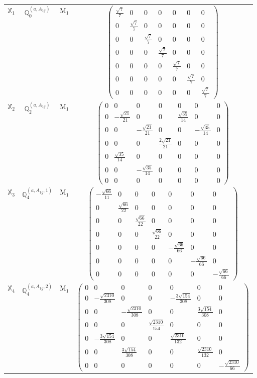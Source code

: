 \documentclass[fleqn,10pt,landscape]{article}
\begin{document}
\begin{itemize}
\begin{center}
\begin{longtable}{c|c|c|c}
$ \mathbb{X}_{1} $ & $\mathbb{Q}_{0}^{(a,A_{1g})}$ & M$_{1}$ & $\begin{pmatrix} \frac{\sqrt{7}}{7} & 0 & 0 & 0 & 0 & 0 & 0 \\ 0 & \frac{\sqrt{7}}{7} & 0 & 0 & 0 & 0 & 0 \\ 0 & 0 & \frac{\sqrt{7}}{7} & 0 & 0 & 0 & 0 \\ 0 & 0 & 0 & \frac{\sqrt{7}}{7} & 0 & 0 & 0 \\ 0 & 0 & 0 & 0 & \frac{\sqrt{7}}{7} & 0 & 0 \\ 0 & 0 & 0 & 0 & 0 & \frac{\sqrt{7}}{7} & 0 \\ 0 & 0 & 0 & 0 & 0 & 0 & \frac{\sqrt{7}}{7} \end{pmatrix}$ \\
$ \mathbb{X}_{2} $ & $\mathbb{Q}_{2}^{(a,A_{1g})}$ & M$_{1}$ & $\begin{pmatrix} 0 & 0 & 0 & 0 & 0 & 0 & 0 \\ 0 & - \frac{\sqrt{21}}{21} & 0 & 0 & \frac{\sqrt{35}}{14} & 0 & 0 \\ 0 & 0 & - \frac{\sqrt{21}}{21} & 0 & 0 & - \frac{\sqrt{35}}{14} & 0 \\ 0 & 0 & 0 & \frac{2 \sqrt{21}}{21} & 0 & 0 & 0 \\ 0 & \frac{\sqrt{35}}{14} & 0 & 0 & 0 & 0 & 0 \\ 0 & 0 & - \frac{\sqrt{35}}{14} & 0 & 0 & 0 & 0 \\ 0 & 0 & 0 & 0 & 0 & 0 & 0 \end{pmatrix}$ \\
$ \mathbb{X}_{3} $ & $\mathbb{Q}_{4}^{(a,A_{1g},1)}$ & M$_{1}$ & $\begin{pmatrix} - \frac{\sqrt{66}}{11} & 0 & 0 & 0 & 0 & 0 & 0 \\ 0 & \frac{\sqrt{66}}{22} & 0 & 0 & 0 & 0 & 0 \\ 0 & 0 & \frac{\sqrt{66}}{22} & 0 & 0 & 0 & 0 \\ 0 & 0 & 0 & \frac{\sqrt{66}}{22} & 0 & 0 & 0 \\ 0 & 0 & 0 & 0 & - \frac{\sqrt{66}}{66} & 0 & 0 \\ 0 & 0 & 0 & 0 & 0 & - \frac{\sqrt{66}}{66} & 0 \\ 0 & 0 & 0 & 0 & 0 & 0 & - \frac{\sqrt{66}}{66} \end{pmatrix}$ \\
$ \mathbb{X}_{4} $ & $\mathbb{Q}_{4}^{(a,A_{1g},2)}$ & M$_{1}$ & $\begin{pmatrix} 0 & 0 & 0 & 0 & 0 & 0 & 0 \\ 0 & - \frac{\sqrt{2310}}{308} & 0 & 0 & - \frac{3 \sqrt{154}}{308} & 0 & 0 \\ 0 & 0 & - \frac{\sqrt{2310}}{308} & 0 & 0 & \frac{3 \sqrt{154}}{308} & 0 \\ 0 & 0 & 0 & \frac{\sqrt{2310}}{154} & 0 & 0 & 0 \\ 0 & - \frac{3 \sqrt{154}}{308} & 0 & 0 & \frac{\sqrt{2310}}{132} & 0 & 0 \\ 0 & 0 & \frac{3 \sqrt{154}}{308} & 0 & 0 & \frac{\sqrt{2310}}{132} & 0 \\ 0 & 0 & 0 & 0 & 0 & 0 & - \frac{\sqrt{2310}}{66} \end{pmatrix}$ \\

\end{longtable}
\end{center}
\end{itemize}
\end{document}
